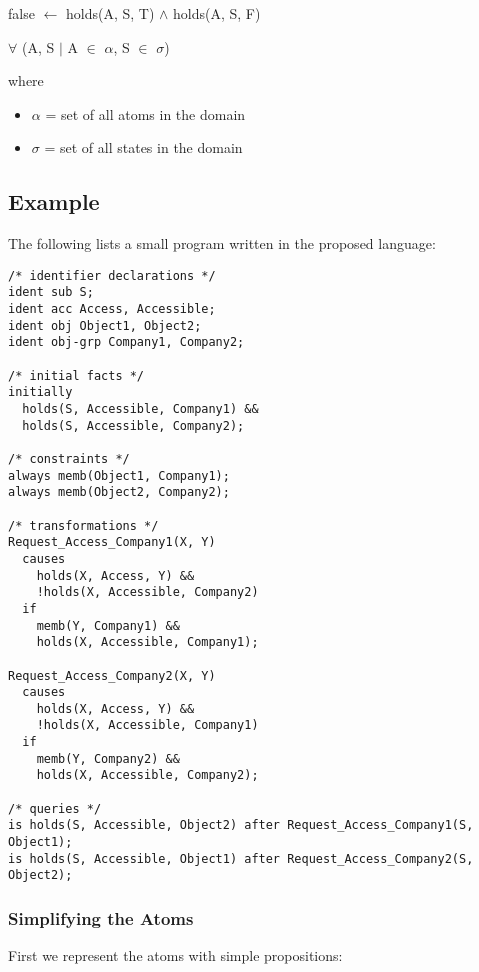 \documentclass[a4paper]{article}
\begin{document}
      \begin{list}{}{}
        \item false $\leftarrow$ holds(A, S, T) $\land$ holds(A, S, F)
      \end{list}

      $\forall$ (A, S $\mid$ A $\in$ $\alpha$, S $\in$ $\sigma$)

      where

      \begin{itemize}
        \item $\alpha$ = set of all atoms in the domain
        \item $\sigma$ = set of all states in the domain
      \end{itemize}

    \subsection{Example}

      The following lists a small program written in the proposed language:

      \begin{verbatim}
/* identifier declarations */
ident sub S;
ident acc Access, Accessible;
ident obj Object1, Object2;
ident obj-grp Company1, Company2;

/* initial facts */
initially
  holds(S, Accessible, Company1) &&
  holds(S, Accessible, Company2);

/* constraints */
always memb(Object1, Company1);
always memb(Object2, Company2);

/* transformations */
Request_Access_Company1(X, Y)
  causes
    holds(X, Access, Y) &&
    !holds(X, Accessible, Company2)
  if
    memb(Y, Company1) &&
    holds(X, Accessible, Company1);

Request_Access_Company2(X, Y)
  causes
    holds(X, Access, Y) &&
    !holds(X, Accessible, Company1)
  if
    memb(Y, Company2) &&
    holds(X, Accessible, Company2);

/* queries */
is holds(S, Accessible, Object2) after Request_Access_Company1(S, Object1);
is holds(S, Accessible, Object1) after Request_Access_Company2(S, Object2);
      \end{verbatim}


      \subsubsection{Simplifying the Atoms}

        First we represent the atoms with simple propositions:
\end{document}
